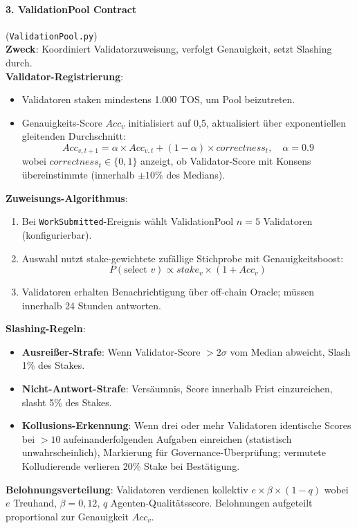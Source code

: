 \documentclass[11pt]{article}
\begin{document}
\paragraph{3. ValidationPool Contract} (\texttt{ValidationPool.py})\\
\textbf{Zweck}: Koordiniert Validatorzuweisung, verfolgt Genauigkeit, setzt Slashing durch.\\
\textbf{Validator-Registrierung}:
\begin{itemize}[noitemsep]
  \item Validatoren staken mindestens 1.000 TOS, um Pool beizutreten.
  \item Genauigkeits-Score $Acc_v$ initialisiert auf 0,5, aktualisiert über exponentiellen gleitenden Durchschnitt:
    \begin{equation}
    Acc_{v,t+1} = \alpha \times Acc_{v,t} + (1-\alpha) \times correctness_t, \quad \alpha = 0.9
    \end{equation}
    wobei $correctness_t \in \{0,1\}$ anzeigt, ob Validator-Score mit Konsens übereinstimmte (innerhalb $\pm10\%$ des Medians).
\end{itemize}
\textbf{Zuweisungs-Algorithmus}:
\begin{enumerate}[noitemsep]
  \item Bei \texttt{WorkSubmitted}-Ereignis wählt ValidationPool $n=5$ Validatoren (konfigurierbar).
  \item Auswahl nutzt stake-gewichtete zufällige Stichprobe mit Genauigkeitsboost:
    \begin{equation}
    P(\text{select } v) \propto stake_v \times (1 + Acc_v)
    \end{equation}
  \item Validatoren erhalten Benachrichtigung über off-chain Oracle; müssen innerhalb 24 Stunden antworten.
\end{enumerate}
\textbf{Slashing-Regeln}:
\begin{itemize}[noitemsep]
  \item \textbf{Ausreißer-Strafe}: Wenn Validator-Score $>2\sigma$ vom Median abweicht, Slash 1\% des Stakes.
  \item \textbf{Nicht-Antwort-Strafe}: Versäumnis, Score innerhalb Frist einzureichen, slasht 5\% des Stakes.
  \item \textbf{Kollusions-Erkennung}: Wenn drei oder mehr Validatoren identische Scores bei $>10$ aufeinanderfolgenden Aufgaben einreichen (statistisch unwahrscheinlich), Markierung für Governance-Überprüfung; vermutete Kolludierende verlieren 20\% Stake bei Bestätigung.
\end{itemize}
\textbf{Belohnungsverteilung}: Validatoren verdienen kollektiv $e \times \beta \times (1-q)$ wobei $e$ Treuhand, $\beta=0,12$, $q$ Agenten-Qualitätsscore. Belohnungen aufgeteilt proportional zur Genauigkeit $Acc_v$.
\end{document}
